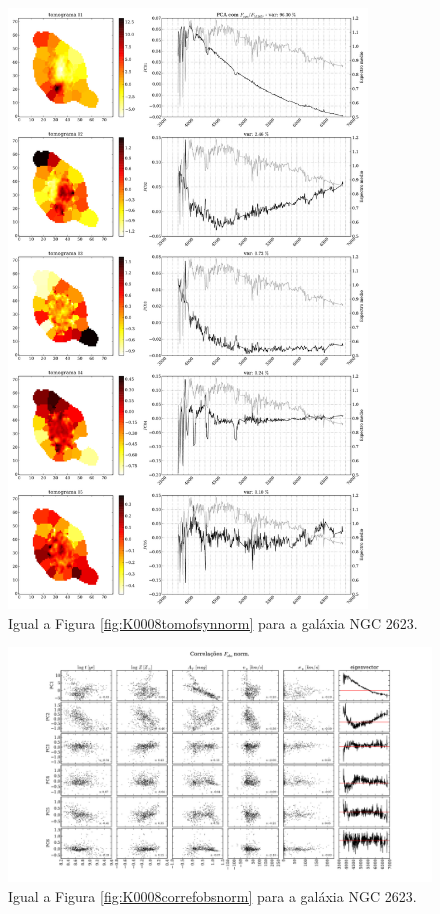 \begin{figure}
    \includegraphics[width=0.85\textwidth]{figuras/K0213-tomo-syn-norm.pdf}
    \caption[Tomogramas de 1 a 5 para o cubo $F_{syn}$ norm. - NGC 2623.]
    {Igual a Figura \ref{fig:K0008tomofsynnorm} para a galáxia NGC 2623.}
    \label{fig:K0213tomofsynnorm}
\end{figure}

\begin{figure}
    \includegraphics[width=1.3\textwidth, angle=-90]{figuras/K0213-correl-f_obs_norm-PCvsPhys.pdf}
	\caption[Correlações PCs vs. par\^ametros f\'isicos - $F_{obs}$ norm. - NGC 2623.]
	{Igual a Figura \ref{fig:K0008correfobsnorm} para a galáxia NGC 2623.}
    \label{fig:K0213correfobsnorm}
\end{figure}

